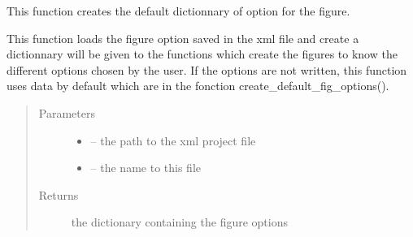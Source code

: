 \documentclass[letterpaper,10pt,english]{sphinxmanual}
\begin{document}
\begin{fulllineitems}
\label{\detokenize{index:src_GUI.output_fig_GUI.create_default_figoption}}
This function creates the default dictionnary of option for the figure.

\end{fulllineitems}


\begin{fulllineitems}
\label{\detokenize{index:src_GUI.output_fig_GUI.load_fig_option}}
This function loads the figure option saved in the xml file and create a dictionnary will be given to the functions
which create the figures to know the different options chosen by the user. If the options are not written, this
function uses data by default which are in the fonction create\_default\_fig\_options().
\begin{quote}\begin{description}
\item[{Parameters}] \leavevmode\begin{itemize}
\item {} 
 -- the path to the xml project file

\item {} 
 -- the name to this file

\end{itemize}

\item[{Returns}] \leavevmode
the dictionary containing the figure options

\end{description}\end{quote}

\end{fulllineitems}

\end{document}
